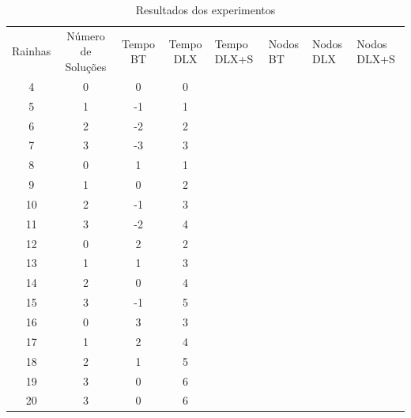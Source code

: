 \documentclass{article}
\begin{document}
\begin{center}
  \begin{table}
  \centering
  \begin{tabular}{ c c c c }
    Rainhas & Número de Soluções & Tempo BT & Tempo DLX & Tempo DLX+S & Nodos BT & Nodos DLX & Nodos DLX+S \\
    4       & 0 & 0   & 0    \\
    5       & 1 & -1  & 1    \\
    6       & 2 & -2  & 2    \\
    7       & 3 & -3  & 3    \\
    8       & 0 & 1   & 1    \\
    9       & 1 & 0   & 2    \\
    10       & 2 & -1  & 3    \\
    11       & 3 & -2  & 4    \\
    12       & 0 & 2   & 2    \\
    13       & 1 & 1   & 3    \\
    14       & 2 & 0   & 4    \\
    15       & 3 & -1  & 5    \\
    16       & 0 & 3   & 3    \\
    17       & 1 & 2   & 4    \\
    18       & 2 & 1   & 5    \\
    19       & 3 & 0   & 6    \\
    20       & 3 & 0   & 6    \\
  \end{tabular}
  \caption{Resultados dos experimentos}
  \label{tab:tab_2}
  \end{table}
\end{center}

 

\end{document}
